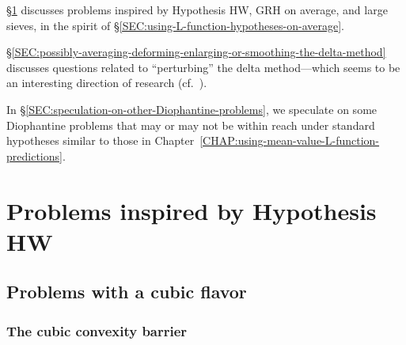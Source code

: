 \documentclass[12pt]{report}
\begin{document}
\S\ref{SEC:other-open-problems-of-a-similar-nature} discusses problems inspired by Hypothesis HW, GRH on average, and large sieves, in the spirit of \S\ref{SEC:using-L-function-hypotheses-on-average}.

\S\ref{SEC:possibly-averaging-deforming-enlarging-or-smoothing-the-delta-method}
discusses questions related to
``perturbing'' the delta method---which seems to be
an interesting direction of research (cf.~\cite{marmon2019hasse}).

In \S\ref{SEC:speculation-on-other-Diophantine-problems},
we speculate on some Diophantine problems
that may or may not be within reach under
standard hypotheses similar to those in Chapter~\ref{CHAP:using-mean-value-L-function-predictions}.


\section{Problems inspired by Hypothesis HW}
\label{SEC:other-open-problems-of-a-similar-nature}



\subsection{Problems with a cubic flavor}

\subsubsection{The cubic convexity barrier}
\end{document}
